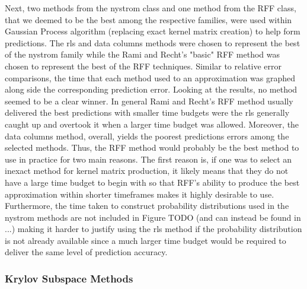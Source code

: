 Next, two methods from the nystrom class and one method from the RFF class, that we deemed to be the best among the respective families, were used within Gaussian Process algorithm (replacing exact kernel matrix creation) to help form predictions. The rls and data columns methods were chosen to represent the best of the nystrom family while the Rami and Recht's "basic" RFF method was chosen to represent the best of the RFF techniques. Similar to relative error comparisons, the time that each method used to an approximation was graphed along side the corresponding prediction error. Looking at the results, no method seemed to be a clear winner. In general Rami and Recht's RFF method usually delivered the best predictions with smaller time budgets were the rls generally caught up and overtook it when a larger time budget was allowed. Moreover, the data columns method, overall, yields the poorest predictions errors among the selected methods. Thus, the RFF method would probably be the best method to use in practice for two main reasons. The first reason is, if one was to select an inexact method for kernel matrix production, it likely means that they do not have a large time budget to begin with so that RFF's ability to produce the best approximation within shorter timeframes makes it highly desirable to use. Furthermore, the time taken to construct probability distributions used in the nystrom methods are not included in Figure TODO (and can instead be found in ...) making it harder to justify using the rls method if the probability distribution is not already available since a much larger time budget would be required to deliver the same level of prediction accuracy.

\subsubsection{Krylov Subspace Methods}\label{Section5.3.2}

